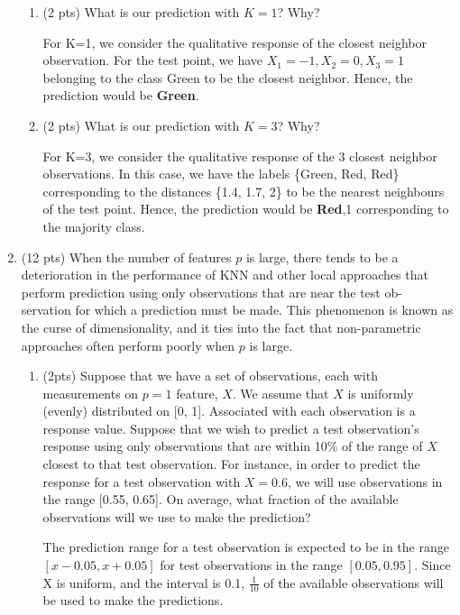 \documentclass[a4paper]{article}
\theoremstyle{definition}
\newenvironment{soln}{
    \leavevmode\color{blue}\ignorespaces
}{}
\begin{document}
\begin{enumerate}
\begin{enumerate}
	\item (2 pts) What is our prediction with $K=1$? Why?
	
	\begin{soln}  For K=1, we consider the qualitative response of the closest neighbor observation. For the test point, we have $X_1=-1,X_2=0, X_3=1$ belonging to the class Green to be the closest neighbor. Hence, the prediction would be \textbf{Green}.\end{soln}
	
	\item (2 pts) What is our prediction with $K=3$? Why?
	
	\begin{soln}   For K=3, we consider the qualitative response of the 3 closest neighbor observations. In this case, we have the labels \{Green, Red, Red\} corresponding to the distances \{1.4, 1.7, 2\} to be the nearest neighbours of the test point. Hence, the prediction would be \textbf{Red},1 corresponding to the majority class. \end{soln}

\end{enumerate}

\item (12 pts) When the number of features $p$ is large, there tends to be a deterioration in the performance of KNN and other local approaches that perform prediction using only observations that are near the test ob- servation for which a prediction must be made. This phenomenon is known as the curse of dimensionality, and it ties into the fact that non-parametric approaches often perform poorly when $p$ is large.

\begin{enumerate}
	\item (2pts) Suppose that we have a set of observations, each with measurements on $p=1$ feature, $X$. We assume that $X$ is uniformly (evenly) distributed on [0, 1]. Associated with each observation is a response value. Suppose that we wish to predict a test observation’s response using only observations that are within 10\% of the range of $X$ closest to that test observation. For instance, in order to predict the response for a test observation with $X=0.6$, we will use observations in the range [0.55, 0.65]. On average, what fraction of the available observations will we use to make the prediction?
	
	\begin{soln}  The prediction range for a test observation is expected to be in the range $[x-0.05, x+0.05]$ for test observations in the range $[0.05, 0.95]$. Since X is uniform, and the interval is 0.1, $\frac{1}{10}$ of the available observations will be used to make the predictions.  \end{soln}
	

\end{enumerate}
\end{enumerate}
\end{document}
